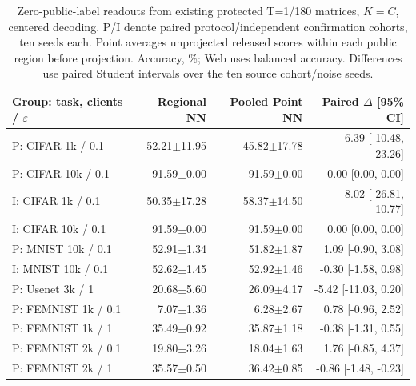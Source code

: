 \begin{table}[t]
\caption{Zero-public-label readouts from existing protected T=1/180 matrices, $K=C$, centered decoding. P/I denote paired protocol/independent confirmation cohorts, ten seeds each. Point averages unprojected released scores within each public region before projection. Accuracy, \%; Web uses balanced accuracy. Differences use paired Student intervals over the ten source cohort/noise seeds.}
\label{tab:zero-label-pool}\small
\centering
\begin{tabular}{@{}lrrr@{}}\toprule
Group: task, clients / $\varepsilon$ & Regional NN & Pooled Point NN & Paired $\Delta$ [95\% CI] \\
\midrule
P: CIFAR 1k / 0.1 & 52.21$\pm$11.95 & 45.82$\pm$17.78 & 6.39 [-10.48, 23.26] \\
P: CIFAR 10k / 0.1 & 91.59$\pm$0.00 & 91.59$\pm$0.00 & 0.00 [0.00, 0.00] \\
I: CIFAR 1k / 0.1 & 50.35$\pm$17.28 & 58.37$\pm$14.50 & -8.02 [-26.81, 10.77] \\
I: CIFAR 10k / 0.1 & 91.59$\pm$0.00 & 91.59$\pm$0.00 & 0.00 [0.00, 0.00] \\
P: MNIST 10k / 0.1 & 52.91$\pm$1.34 & 51.82$\pm$1.87 & 1.09 [-0.90, 3.08] \\
I: MNIST 10k / 0.1 & 52.62$\pm$1.45 & 52.92$\pm$1.46 & -0.30 [-1.58, 0.98] \\
P: Usenet 3k / 1 & 20.68$\pm$5.60 & 26.09$\pm$4.17 & -5.42 [-11.03, 0.20] \\
P: FEMNIST 1k / 0.1 & 7.07$\pm$1.36 & 6.28$\pm$2.67 & 0.78 [-0.96, 2.52] \\
P: FEMNIST 1k / 1 & 35.49$\pm$0.92 & 35.87$\pm$1.18 & -0.38 [-1.31, 0.55] \\
P: FEMNIST 2k / 0.1 & 19.80$\pm$3.26 & 18.04$\pm$1.63 & 1.76 [-0.85, 4.37] \\
P: FEMNIST 2k / 1 & 35.57$\pm$0.50 & 36.42$\pm$0.85 & -0.86 [-1.48, -0.23] \\
\bottomrule\end{tabular}
\end{table}
